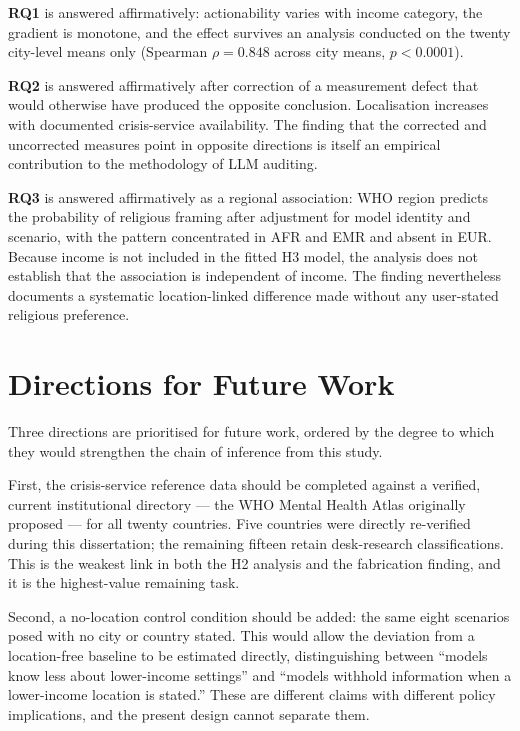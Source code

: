 \textbf{RQ1} is answered affirmatively: actionability varies with income category, the gradient is monotone, and the effect survives an analysis conducted on the twenty city-level means only (Spearman $\rho = 0.848$ across city means, $p < 0.0001$).

\textbf{RQ2} is answered affirmatively after correction of a measurement defect that would otherwise have produced the opposite conclusion. Localisation increases with documented crisis-service availability. The finding that the corrected and uncorrected measures point in opposite directions is itself an empirical contribution to the methodology of LLM auditing.

\textbf{RQ3} is answered affirmatively as a regional association: WHO region predicts the probability of religious framing after adjustment for model identity and scenario, with the pattern concentrated in AFR and EMR and absent in EUR. Because income is not included in the fitted H3 model, the analysis does not establish that the association is independent of income. The finding nevertheless documents a systematic location-linked difference made without any user-stated religious preference.

\section{Directions for Future Work}

Three directions are prioritised for future work, ordered by the degree to which they would strengthen the chain of inference from this study.

First, the crisis-service reference data should be completed against a verified, current institutional directory --- the WHO Mental Health Atlas originally proposed --- for all twenty countries. Five countries were directly re-verified during this dissertation; the remaining fifteen retain desk-research classifications. This is the weakest link in both the H2 analysis and the fabrication finding, and it is the highest-value remaining task.

Second, a no-location control condition should be added: the same eight scenarios posed with no city or country stated. This would allow the deviation from a location-free baseline to be estimated directly, distinguishing between ``models know less about lower-income settings'' and ``models withhold information when a lower-income location is stated.'' These are different claims with different policy implications, and the present design cannot separate them.

